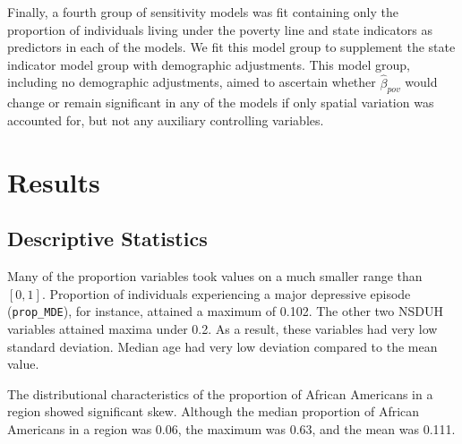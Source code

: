 \documentclass{article}
\begin{document}
Finally, a fourth group of sensitivity models was fit
containing only the proportion of individuals living
under the poverty line and state indicators as predictors
in each of the models.
We fit this model group to supplement the state indicator
model group with demographic adjustments.
This model group, including no demographic adjustments,
aimed to ascertain whether
$\hat{\beta}_{pov}$ would change or remain significant
in any of the models
if only spatial variation was accounted for,
but not any auxiliary controlling variables.

\section{Results}

\subsection{Descriptive Statistics}

Many of the proportion variables took values on a much smaller range
than $[0,1]$.
Proportion of individuals experiencing a major depressive episode
(\texttt{prop\_MDE}),
for instance, attained a maximum of 0.102.
The other two NSDUH variables attained maxima under 0.2.
As a result, these variables had very low standard deviation.
Median age had very low deviation compared to the mean value.

The distributional characteristics of the proportion of African Americans
in a region showed significant skew.
Although the median proportion of African Americans in a region was 0.06,
the maximum was 0.63, and the mean was 0.111.
\end{document}
